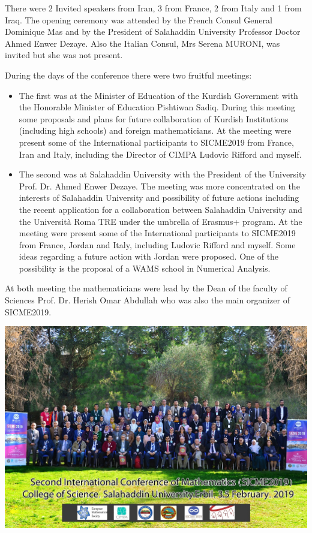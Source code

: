 \documentclass[12pt,a4paper]{scrartcl}
\begin{document}
There were 2 Invited speakers from Iran, 3 from France, 2 from Italy and 1 from Iraq.
The opening ceremony was attended by the French Consul General 
Dominique Mas and by the President of Salahaddin University Professor Doctor Ahmed Enwer Dezaye.
Also the Italian Consul, Mrs Serena MURONI, was invited but she was not present.

During the days of the conference there were two fruitful meetings:


\begin{itemize}
 \item The first was at the Minister of Education of the Kurdish Government with the 
 Honorable Minister of Education Pishtiwan Sadiq. During this meeting some proposals and plans for future collaboration  of Kurdish Institutions (including high schools) and foreign mathematicians. At the meeting were present some of the International participants to SICME2019 from France, Iran and Italy, including the Director of CIMPA Ludovic Rifford and myself.
\item The second was at Salahaddin University with the President of the University Prof. Dr. Ahmed Enwer Dezaye. The meeting was more concentrated on the interests of Salahaddin University and possibility of future actions including the recent application for a collaboration between Salahaddin University and the Universit\`a Roma TRE under the umbrella of Erasmus+ program. At the meeting were present some of the International participants to SICME2019 from France, Jordan and Italy, including Ludovic Rifford and myself. Some ideas regarding a future action with Jordan were proposed. One of the possibility is the  proposal of a WAMS school in Numerical Analysis.
\end{itemize}

At both meeting the mathematicians were lead by the Dean of the faculty of Sciences Prof. Dr. Herish Omar Abdullah who was also the main organizer of SICME2019.\bigskip
{}

\centerline{\includegraphics[width=18cm]{tawaw2.jpg}}
\end{document}
